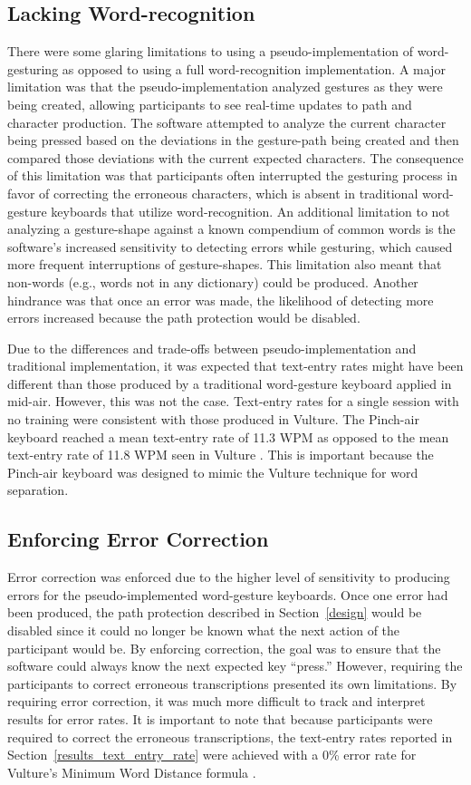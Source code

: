 \subsection{Lacking Word-recognition}
There were some glaring limitations to using a pseudo-implementation of word-gesturing as opposed to using a full word-recognition implementation. A major limitation was that the pseudo-implementation analyzed gestures as they were being created, allowing participants to see real-time updates to path and character production. The software attempted to analyze the current character being pressed based on the deviations in the gesture-path being created and then compared those deviations with the current expected characters. The consequence of this limitation was that participants often interrupted the gesturing process in favor of correcting the erroneous characters, which is absent in traditional word-gesture keyboards that utilize word-recognition. An additional limitation to not analyzing a gesture-shape against a known compendium of common words is the software's increased sensitivity to detecting errors while gesturing, which caused more frequent interruptions of gesture-shapes. This limitation also meant that non-words (e.g., words not in any dictionary) could be produced. Another hindrance was that once an error was made, the likelihood of detecting more errors increased because the path protection would be disabled.

Due to the differences and trade-offs between pseudo-implementation and traditional implementation, it was expected that text-entry rates might have been different than those produced by a traditional word-gesture keyboard applied in mid-air. However, this was not the case. Text-entry rates for a single session with no training were consistent with those produced in Vulture. The Pinch-air keyboard reached a mean text-entry rate of 11.3 WPM as opposed to the mean text-entry rate of 11.8 WPM seen in Vulture \cite{ref_vulture}. This is important because the Pinch-air keyboard was designed to mimic the Vulture technique for word separation.

\subsection{Enforcing Error Correction}
Error correction was enforced due to the higher level of sensitivity to producing errors for the pseudo-implemented word-gesture keyboards. Once one error had been produced, the path protection described in Section~\ref{design} would be disabled since it could no longer be known what the next action of the participant would be. By enforcing correction, the goal was to ensure that the software could always know the next expected key ``press.'' However, requiring the participants to correct erroneous transcriptions presented its own limitations. By requiring error correction, it was much more difficult to track and interpret results for error rates. It is important to note that because participants were required to correct the erroneous transcriptions, the text-entry rates reported in Section~\ref{results_text_entry_rate} were achieved with a 0\% error rate for Vulture's Minimum Word Distance formula \cite{ref_vulture}.


